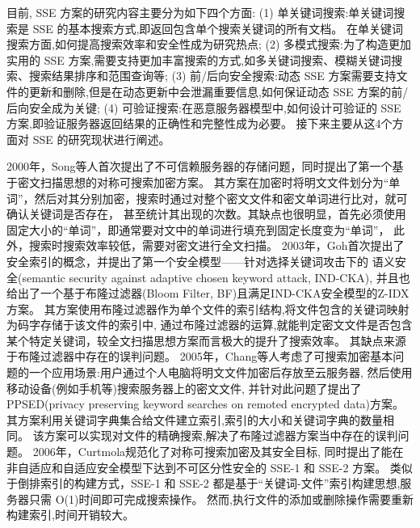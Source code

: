 目前, SSE 方案的研究内容主要分为如下四个方面:
(1) 单关键词搜索:单关键词搜索是 SSE 的基本搜索方式,即返回包含单个搜索关键词的所有文档。
在单关键词搜索方面,如何提高搜索效率和安全性成为研究热点;
(2) 多模式搜索:为了构造更加实用的 SSE 方案,需要支持更加丰富搜索的方式,如多关键词搜索、模糊关键词搜索、搜索结果排序和范围查询等;
(3) 前/后向安全搜索:动态 SSE 方案需要支持文件的更新和删除,但是在动态更新中会泄漏重要信息,如何保证动态 SSE 方案的前/后向安全成为关键;
(4) 可验证搜索:在恶意服务器模型中,如何设计可验证的 SSE 方案,即验证服务器返回结果的正确性和完整性成为必要。
接下来主要从这4个方面对 SSE 的研究现状进行阐述。

2000年，Song等人首次提出了不可信赖服务器的存储问题，同时提出了第一个基于密文扫描思想的对称可搜索加密方案。
其方案在加密时将明文文件划分为“单词”，然后对其分别加密，搜索时通过对整个密文文件和密文单词进行比对，就可确认关键词是否存在，
甚至统计其出现的次数。其缺点也很明显，首先必须使用固定大小的“单词”，即通常要对文中的单词进行填充到固定长度变为“单词”，
此外，搜索时搜索效率较低，需要对密文进行全文扫描。
2003年，Goh首次提出了安全索引的概念，并提出了第一个安全模型——针对选择关键词攻击下的
语义安全(semantic security against adaptive chosen keyword attack, IND-CKA),
并且也给出了一个基于布隆过滤器(Bloom Filter, BF)且满足IND-CKA安全模型的Z-IDX方案。
其方案使用布隆过滤器作为单个文件的索引结构,将文件包含的关键词映射为码字存储于该文件的索引中,
通过布隆过滤器的运算,就能判定密文文件是否包含某个特定关键词，较全文扫描思想方案而言极大的提升了搜索效率。
其缺点来源于布隆过滤器中存在的误判问题。
2005年，Chang等人考虑了可搜索加密基本问题的一个应用场景:用户通过个人电脑将明文文件加密后存放至云服务器,
然后使用移动设备(例如手机等)搜索服务器上的密文文件,
并针对此问题了提出了 PPSED(privacy preserving keyword searches on remoted encrypted data)方案。
其方案利用关键词字典集合给文件建立索引,索引的大小和关键词字典的数量相同。
该方案可以实现对文件的精确搜索,解决了布隆过滤器方案当中存在的误判问题。
2006年，Curtmola规范化了对称可搜索加密及其安全目标,
同时提出了能在非自适应和自适应安全模型下达到不可区分性安全的 SSE-1 和 SSE-2 方案。
类似于倒排索引的构建方式，SSE-1 和 SSE-2 都是基于“关键词-文件”索引构建思想,服务器只需 O(1)时间即可完成搜索操作。
然而,执行文件的添加或删除操作需要重新构建索引,时间开销较大。

